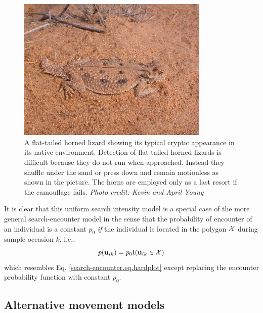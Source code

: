 \begin{figure}[ht]
\centering
\includegraphics[width=3.6in,height=2.7in]{Ch15-searchencounter/figs/horny_lizard.jpg}
\caption{A flat-tailed horned lizard showing its typical cryptic
  appearance in its native environment.  Detection of flat-tailed
  horned lizards is difficult because they do not run when
  approached. Instead they shuffle under the sand or press down and
  remain motionless as shown in the picture.  The horns are employed
  only as a last resort if the camouflage fails.  {\it Photo credit:
    Kevin and April Young} }
\label{searchencounter.fig.hornylizard}
\end{figure}

It is clear that this uniform search intensity model is a special case
of the more general search-encounter model in the sense that the
probability of encounter of an individual is a constant $p_{0}$ {\it
  if} the individual is located in the polygon ${\cal X}$ during
sample occasion $k$, i.e.,
\[
p({\bf u}_{ik}) = p_{0} \mbox{I}({\bf u}_{ik} \in {\cal X})
\]
which resembles Eq. \ref{search-encounter.eq.hardplot} except
replacing the encounter probability function with constant $p_{0}$.


\subsection{Alternative movement models}
\label{searchencounter.sec.movement}

